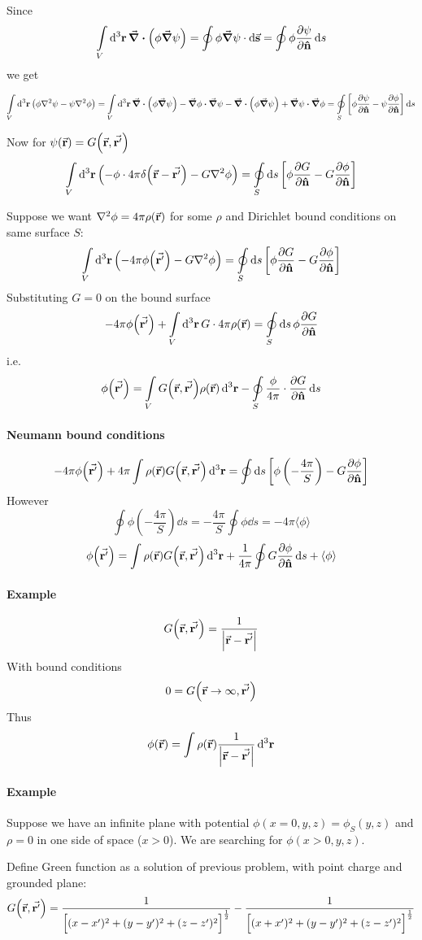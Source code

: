 Since
$$\int\limits_V \dd[3]{\vb{r}} \div(\phi\grad{\psi}) = \oint \phi \grad{\psi} \cdot \dd{\va{s}}= \oint \phi \pdv{\psi}{ \vu{n}} \dd{s}$$
we get

$$\int\limits_V \dd[3]{\vb{r}} \left( \phi  \laplacian{\psi} - \psi \laplacian{ \phi} \right)   = \int\limits_V \dd[3]{\vb{r}} \div(\phi \grad{\psi}) - \grad{\phi} \vdot \grad{\psi} - \div\left(\phi \grad{\psi}\right) + \grad{\psi} \vdot \grad{\phi }= \oint\limits_S \left[ \phi \pdv{\psi}{\vu{n}} - \psi \pdv{\phi}{\vu{n}} \right]\dd{s}$$ %


Now for $\psi\qty(\va{r}) = G\qty(\va{r}, \va{r'})$
$$\int\limits_V \dd[3]{\vb{r}} \left( - \phi \cdot 4\pi \delta \qty(\va{r}-\va{r'}) - G \laplacian{\phi} \right)  = \oint\limits_S\dd{s} \left[ \phi \pdv{ G}{ \vu{n}} - G \pdv{ \phi}{ \vu{n}}\right] $$

Suppose we want $\laplacian{\phi} = 4\pi \rho(\va{r})$ for some $\rho$ and Dirichlet bound conditions on same surface $S$:
$$\int\limits_V \dd[3]{\vb{r}}  \left( -4\pi\phi\qty(\va{r'}) - G \laplacian{\phi} \right) = \oint\limits_S\dd{s} \left[ \phi \pdv{G}{\vu{n}} - G \pdv{\phi}{\vu{n}} \right] $$
Substituting $G=0$ on the bound surface
$$ -4\pi\phi\qty(\va{r'}) + \int\limits_V \dd[3]{\vb{r}}  G \cdot 4\pi \rho\qty(\va{r})   = \oint\limits_S \dd{s}  \phi\pdv{G}{\vu{n}}  $$
i.e.
$$ \phi\qty(\va{r'}) = \int\limits_V    G \qty(\va{r}, \va{r'})\rho\qty(\va{r}) \dd[3]{\vb{r}} - \oint\limits_S  \frac{\phi }{4\pi}\cdot \pdv{G}{\vu{n}} \dd{s} $$

\paragraph{Neumann bound conditions}
$$-4\pi \phi\qty(\va{r'}) + 4\pi \int \rho\qty(\va{r}) G\qty(\va{r}, \va{r'}) \dd[3]{\vb{r}} = \oint \dd{s} \left[ \phi \left( -\frac{4\pi}{S}\right) -  G\pdv{\phi}{\vu{n}} \right] $$
However
$$ \oint  \phi \left( -\frac{4\pi}{S}\right)  \dd{s} = -\frac{4\pi}{S} \oint \phi \dd{s} = -4\pi \langle  \phi \rangle$$
$$\phi\qty(\va{r'}) =  \int \rho\qty(\va{r}) G\qty(\va{r}, \va{r'}) \dd[3]{\vb{r}} +  \frac{1 }{4\pi}\oint   G\pdv{\phi}{\vu{n}} \dd{s} + \langle  \phi \rangle$$
\paragraph{Example}
$$G\qty(\va{r}, \va{r'}) = \frac{1}{\abs{\va{r} - \va{r'}}}$$
With bound conditions
$$0 = G\qty(\va{r}\to \infty, \va{r'})$$
Thus
$$\phi\qty(\va{r}) = \int \rho \qty(\va{r}) \frac{1}{\abs{\va{r} - \va{r'}}} \dd[3]{\vb{r}}$$
\paragraph{Example}
Suppose we have an infinite plane with potential $\phi(x=0,y,z)=\phi_S(y,z)$ and $\rho=0$ in one side of space ($x>0$). We are searching for $\phi(x>0,y,z)$.

Define Green function as a solution of previous problem, with point charge and grounded plane:
$$G\qty(\va{r}, \va{r'}) = \frac{1}{\qty\Big[(x-x')^2+(y-y')^2+(z-z')^2]^{\frac{1}{2}}}-\frac{1}{\qty\Big[(x+x')^2+(y-y')^2+(z-z')^2]^{\frac{1}{2}}}$$
